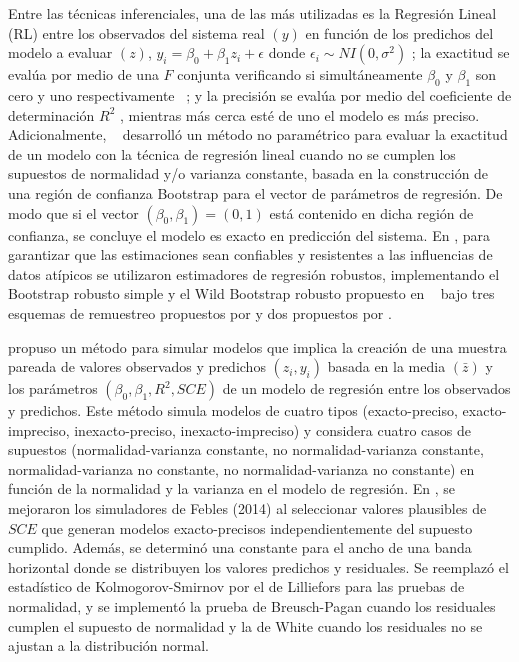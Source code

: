 Entre las técnicas inferenciales, una de las más utilizadas es la Regresión Lineal (RL) entre los observados del sistema real $ (y) $ en función de los predichos del modelo a evaluar $ (z) $, $ y_{i} = \beta_{0} + \beta_{1}z_{i} +\epsilon $  donde $ \epsilon_{i} \sim NI(0,\sigma^{2}) $ ; la exactitud se evalúa por medio de una $ F $ conjunta verificando si simultáneamente $ \beta_{0} $ y $ \beta_{1} $ son cero y uno respectivamente ~\parencites{yang-2004,tedeschi-2006,montgomery-2012}; y la precisión se evalúa por medio del coeficiente de determinación $ R^{2} $ \parencite{balam-2012}, mientras más cerca esté de uno el modelo es más preciso.
Adicionalmente, ~\textcite{zacarias-2023} desarrolló un método no paramétrico para evaluar la exactitud de un modelo con la técnica de regresión lineal cuando no se cumplen los supuestos de normalidad y/o varianza constante, basada en la construcción de una región de confianza Bootstrap para el vector de parámetros de regresión. De modo que si el vector  $ (\beta_{0},\beta_{1})=(0,1) $ está contenido en dicha región de confianza, se concluye el modelo es exacto en predicción del sistema. En \textcite{zacarias-2023}, para garantizar que las estimaciones sean confiables y resistentes a las influencias de datos atípicos se utilizaron estimadores de regresión robustos, implementando el Bootstrap robusto simple y el Wild Bootstrap robusto propuesto en ~\textcite{rana-2012} bajo tres esquemas de remuestreo propuestos por \textcite{wu-1986} y dos propuestos por \textcite{liu-1988}.
\vspace{.5cm}

\textcite{febles-2014} propuso un método para simular modelos que implica la creación de una muestra pareada de valores observados y predichos $ (z_{i},y_{i}) $ basada en la media $ (\bar{z}) $ y los parámetros $ (\beta_{0}, \beta_{1}, R^{2}, SCE) $ de un modelo de regresión entre los observados y predichos. Este método simula modelos de cuatro tipos (exacto-preciso, exacto-impreciso, inexacto-preciso, inexacto-impreciso) y considera cuatro casos de supuestos (normalidad-varianza constante, no normalidad-varianza constante, normalidad-varianza no constante, no normalidad-varianza no constante) en función de la normalidad y la varianza en el modelo de regresión. En \textcite{zacarias-2023}, se mejoraron los simuladores de Febles (2014) al seleccionar valores plausibles de $ SCE $ que generan modelos exacto-precisos independientemente del supuesto cumplido. Además, se determinó una constante para el ancho de una banda horizontal donde se distribuyen los valores predichos y residuales. Se reemplazó el estadístico de Kolmogorov-Smirnov por el de Lilliefors para las pruebas de normalidad, y se implementó la prueba de Breusch-Pagan cuando los residuales cumplen el supuesto de normalidad y la de White cuando los residuales no se ajustan a la distribución normal.
\vspace{.5cm}

